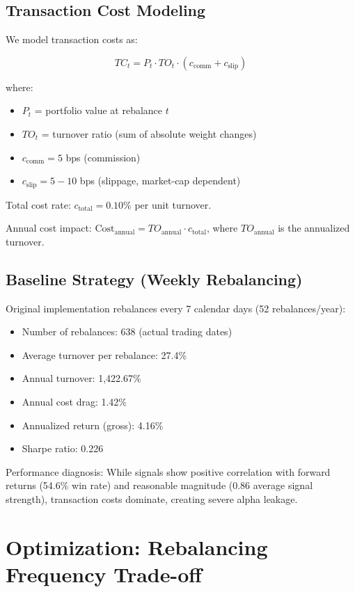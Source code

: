 \documentclass[twocolumn,ieee]{Base_Latex_Template/arithmaxresearch}
\begin{document}
\subsection{Transaction Cost Modeling}

We model transaction costs as:

$$TC_t = P_t \cdot TO_t \cdot (c_{\text{comm}} + c_{\text{slip}})$$

where:
\begin{itemize}
\item $P_t$ = portfolio value at rebalance $t$
\item $TO_t$ = turnover ratio (sum of absolute weight changes)
\item $c_{\text{comm}} = 5$ bps (commission)
\item $c_{\text{slip}} = 5-10$ bps (slippage, market-cap dependent)
\end{itemize}

Total cost rate: $c_{\text{total}} = 0.10\%$ per unit turnover.

Annual cost impact: $\text{Cost}_{\text{annual}} = TO_{\text{annual}} \cdot c_{\text{total}}$, where $TO_{\text{annual}}$ is the annualized turnover.

\subsection{Baseline Strategy (Weekly Rebalancing)}

Original implementation rebalances every 7 calendar days (52 rebalances/year):

\begin{itemize}
\item Number of rebalances: 638 (actual trading dates)
\item Average turnover per rebalance: 27.4\%
\item Annual turnover: 1,422.67\%
\item Annual cost drag: 1.42\%
\item Annualized return (gross): 4.16\%
\item Sharpe ratio: 0.226
\end{itemize}

Performance diagnosis: While signals show positive correlation with forward returns (54.6\% win rate) and reasonable magnitude (0.86 average signal strength), transaction costs dominate, creating severe alpha leakage.

\section{Optimization: Rebalancing Frequency Trade-off}
\end{document}
